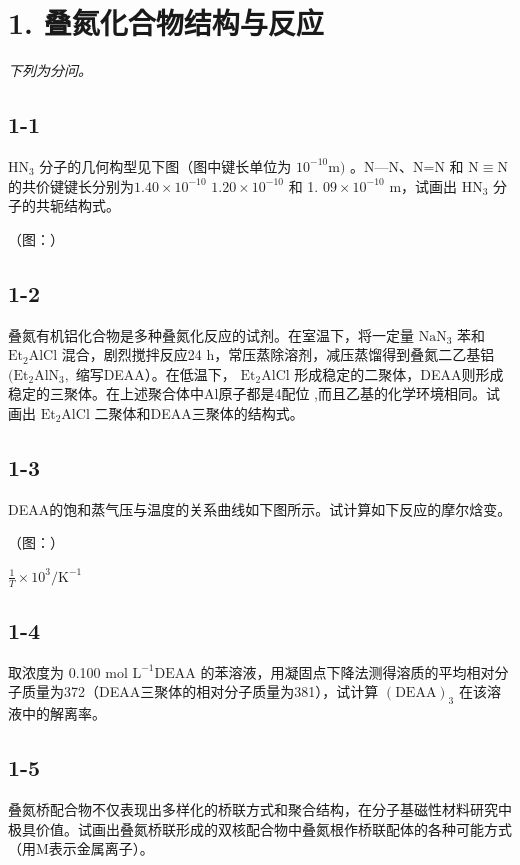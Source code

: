 \section*{1. 叠氮化合物结构与反应}
\textit{下列为分问。}

\subsection*{1-1}
$\mathrm { H N } _ { 3 }$ 分⼦的⼏何构型⻅下图（图中键⻓单位为 $1 0 ^ { - 1 0 } \mathrm { m } )$ 。N—N、N=N 和 $\mathrm { N } { \equiv } \mathrm { N }$ 的共价键键⻓分别为$1 . 4 0 \times 1 0 ^ { - 1 0 }$ $1 . 2 0 \times 1 0 ^ { - 1 0 }$ 和 1. $0 9 \times 1 0 ^ { - 1 0 }$ m，试画出 $\mathrm { H N } _ { 3 }$ 分⼦的共轭结构式。

（图：）

\subsection*{1-2}
叠氮有机铝化合物是多种叠氮化反应的试剂。在室温下，将⼀定量 $\mathrm { N a N _ { 3 } }$ 苯和 $\mathrm { E t _ { 2 } A l C l }$ 混合，剧烈搅拌反应24 h，常压蒸除溶剂，减压蒸馏得到叠氮⼆⼄基铝 $\mathrm { ( E t _ { 2 } A l N _ { 3 } , }$ 缩写DEAA）。在低温下， $\mathrm { E t _ { 2 } A l C l }$ 形成稳定的⼆聚体，DEAA则形成稳定的三聚体。在上述聚合体中Al原⼦都是4配位 ,⽽且⼄基的化学环境相同。试画出 $\mathrm { E t _ { 2 } A l C l }$ ⼆聚体和DEAA三聚体的结构式。

\subsection*{1-3}
DEAA的饱和蒸⽓压与温度的关系曲线如下图所⽰。试计算如下反应的摩尔焓变。

（图：）

$
\frac {1}{T} \times 1 0 ^ {3} / \mathrm{K} ^ {- 1}
$

\subsection*{1-4}
取浓度为 0.100 mol $\mathrm { L } ^ { - 1 } \mathrm { D E A A }$ 的苯溶液，⽤凝固点下降法测得溶质的平均相对分⼦质量为372（DEAA三聚体的相对分⼦质量为381），试计算 $( \mathrm { D E A A } ) _ { 3 }$ 在该溶液中的解离率。

\subsection*{1-5}
叠氮桥配合物不仅表现出多样化的桥联⽅式和聚合结构，在分⼦基磁性材料研究中极具价值。试画出叠氮桥联形成的双核配合物中叠氮根作桥联配体的各种可能⽅式（⽤M表⽰⾦属离⼦）。
